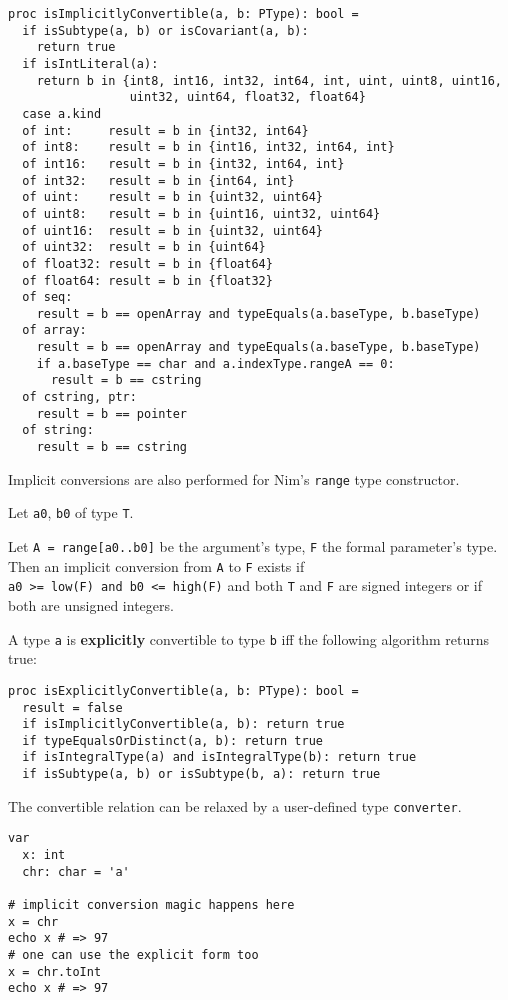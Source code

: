 \begin{verbatim}
proc isImplicitlyConvertible(a, b: PType): bool =
  if isSubtype(a, b) or isCovariant(a, b):
    return true
  if isIntLiteral(a):
    return b in {int8, int16, int32, int64, int, uint, uint8, uint16,
                 uint32, uint64, float32, float64}
  case a.kind
  of int:     result = b in {int32, int64}
  of int8:    result = b in {int16, int32, int64, int}
  of int16:   result = b in {int32, int64, int}
  of int32:   result = b in {int64, int}
  of uint:    result = b in {uint32, uint64}
  of uint8:   result = b in {uint16, uint32, uint64}
  of uint16:  result = b in {uint32, uint64}
  of uint32:  result = b in {uint64}
  of float32: result = b in {float64}
  of float64: result = b in {float32}
  of seq:
    result = b == openArray and typeEquals(a.baseType, b.baseType)
  of array:
    result = b == openArray and typeEquals(a.baseType, b.baseType)
    if a.baseType == char and a.indexType.rangeA == 0:
      result = b == cstring
  of cstring, ptr:
    result = b == pointer
  of string:
    result = b == cstring
\end{verbatim}

Implicit conversions are also performed for Nim's \texttt{range} type
constructor.

Let \texttt{a0}, \texttt{b0} of type \texttt{T}.

Let \texttt{A\ =\ range{[}a0..b0{]}} be the argument's type, \texttt{F}
the formal parameter's type. Then an implicit conversion from \texttt{A}
to \texttt{F} exists if
\texttt{a0\ \textgreater{}=\ low(F)\ and\ b0\ \textless{}=\ high(F)} and
both \texttt{T} and \texttt{F} are signed integers or if both are
unsigned integers.

A type \texttt{a} is \textbf{explicitly} convertible to type \texttt{b}
iff the following algorithm returns true:

\begin{verbatim}
proc isExplicitlyConvertible(a, b: PType): bool =
  result = false
  if isImplicitlyConvertible(a, b): return true
  if typeEqualsOrDistinct(a, b): return true
  if isIntegralType(a) and isIntegralType(b): return true
  if isSubtype(a, b) or isSubtype(b, a): return true
\end{verbatim}

The convertible relation can be relaxed by a user-defined type
\texttt{converter}.

\begin{verbatim}
var
  x: int
  chr: char = 'a'

# implicit conversion magic happens here
x = chr
echo x # => 97
# one can use the explicit form too
x = chr.toInt
echo x # => 97
\end{verbatim}

